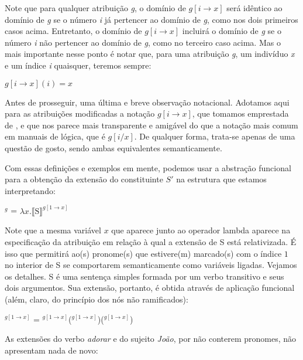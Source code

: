 \n Note que para qualquer atribuição \textit{g}, o domínio de
$g[i \rightarrow x]$ será idêntico ao domínio de \textit{g} se o
número \textit{i} já pertencer ao domínio de \textit{g}, como nos dois primeiros casos acima.
Entretanto, o domínio de $g[i \rightarrow x]$ incluirá o domínio de \textit{g} se o número \textit{i} não
pertencer ao domínio de \textit{g}, como no terceiro caso acima. Mas o mais importante nesse ponto é notar que, para uma atribuição \textit{g}, um indivíduo \textit{x} e um índice \textit{i} quaisquer, teremos sempre:

\begin{exe}
	\ex $g[i \rightarrow x](i) = x$
\end{exe}

\n Antes de prosseguir, uma última e breve observação notacional. Adotamos aqui para as atribuições modificadas a notação $g[i \rightarrow x]$, que tomamos emprestada de \cite{buring05}, e que nos parece mais transparente e amigável do que a notação mais comum em manuais de lógica, que é $g[i/x]$. De qualquer forma, trata-se apenas de uma questão de gosto, sendo ambas equivalentes semanticamente.

Com essas definições e exemplos em mente, podemos usar
a abstração funcional para a obtenção da extensão do
constituinte $S'$ na estrutura que estamos
interpretando:

\begin{exe}
	\ex {}$^{g}$ = $\lambda x. \llbracket \text{S} \rrbracket^{g[1 \rightarrow x]}$ \label{adbel}
\end{exe}

\n Note que a mesma variável $x$ que aparece junto ao operador lambda aparece na especificação da atribuição em relação à qual a extensão de S está relativizada. É isso que permitirá ao(s) pronome(s) que estivere(m) marcado(s) com o índice $1$ no interior de S se comportarem semanticamente como variáveis ligadas. Vejamos os detalhes. S é uma sentença simples formada por um verbo transitivo e seus dois argumentos. Sua extensão, portanto, é obtida através de aplicação funcional (além, claro, do princípio dos nós não ramificados):

\begin{exe}
	\ex {}$^{g[1 \rightarrow x]}$ = $^{g[1 \rightarrow x]}$($^{g[1 \rightarrow x]}$)($^{g[1 \rightarrow x]}$)
\end{exe}

\n As extensões do verbo \textit{adorar} e do sujeito \textit{João}, por não conterem pronomes, não apresentam nada de novo:

